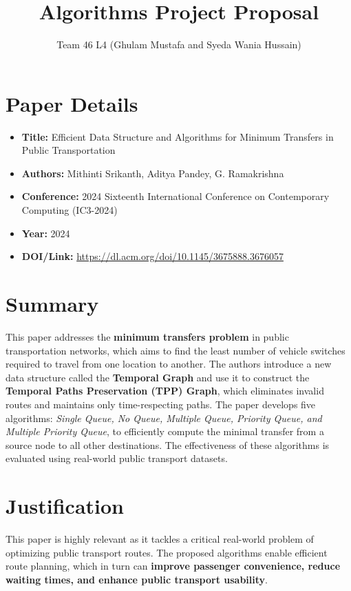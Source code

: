 \documentclass{article}
\title{Algorithms Project Proposal}
\author{Team 46 L4 (Ghulam Mustafa and Syeda Wania Hussain)}
\begin{document}
\maketitle



\section{Paper Details}
\begin{itemize}
\item \textbf{Title:} Efficient Data Structure and Algorithms for Minimum Transfers in Public Transportation
\item \textbf{Authors:} Mithinti Srikanth, Aditya Pandey, G. Ramakrishna
\item \textbf{Conference:} 2024 Sixteenth International Conference on Contemporary Computing (IC3-2024)
\item \textbf{Year:} 2024
\item \textbf{DOI/Link:} \url{https://dl.acm.org/doi/10.1145/3675888.3676057}
\end{itemize}

\section{Summary}
This paper addresses the \textbf{minimum transfers problem} in public transportation networks, which aims to find the least number of vehicle switches required to travel from one location to another. The authors introduce a new data structure called the \textbf{Temporal Graph} and use it to construct the \textbf{Temporal Paths Preservation (TPP) Graph}, which eliminates invalid routes and maintains only time-respecting paths. The paper develops five algorithms: \textit{Single Queue, No Queue, Multiple Queue, Priority Queue, and Multiple Priority Queue}, to efficiently compute the minimal transfer from a source node to all other destinations. The effectiveness of these algorithms is evaluated using real-world public transport datasets.

\section{Justification}
This paper is highly relevant as it tackles a critical real-world problem of optimizing public transport routes. The proposed algorithms enable efficient route planning, which in turn can \textbf{improve passenger convenience, reduce waiting times, and enhance public transport usability}.
\end{document}
